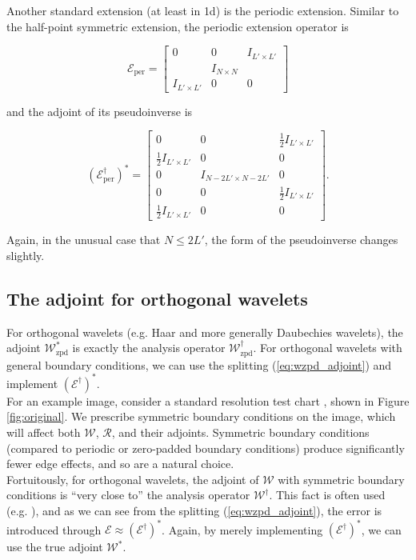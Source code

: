 \documentclass[journal]{IEEEtran}
\begin{document}
Another standard extension (at least in 1d) is the periodic extension.  Similar to the half-point symmetric extension, the periodic extension operator is

\[ \mathcal{E}_\text{per} = \begin{bmatrix} 0 & 0 & I_{L'\times L'}\\&I_{N\times N}&\\I_{L'\times L'}&0&0\end{bmatrix} \] 

\noindent and the adjoint of its pseudoinverse is

\[ \left(\mathcal{E}_\text{per}^\dagger\right)^\ast = \begin{bmatrix} 0 & 0 & \frac{1}{2}I_{L'\times L'}\\\frac{1}{2}I_{L'\times L'}&0&0\\0&I_{N-2L'\times N-2L'}&0\\0&0&\frac{1}{2}I_{L'\times L'}\\\frac{1}{2}I_{L'\times L'}&0&0\end{bmatrix}. \] 

\noindent Again, in the unusual case that $N\le 2L'$, the form of the pseudoinverse changes slightly.\\


\subsection{The adjoint for orthogonal wavelets}
For orthogonal wavelets (e.g. Haar and more generally Daubechies wavelets), the adjoint $\mathcal{W}_\text{zpd}^\ast$ is exactly the analysis operator $\mathcal{W}_\text{zpd}^\dagger$.  For orthogonal wavelets with general boundary conditions, we can use the splitting (\ref{eq:wzpd_adjoint}) and implement $\left(\mathcal{E}^\dagger\right)^\ast$.\\

For an example image, consider a standard resolution test chart \cite{weber_1993}, shown in Figure \ref{fig:original}.  We prescribe symmetric boundary conditions on the image, which will affect both $\mathcal{W}$, $\mathcal{R}$, and their adjoints.  Symmetric boundary conditions (compared to periodic or zero-padded boundary conditions) produce significantly fewer edge effects, and so are a natural choice.\\

Fortuitously, for orthogonal wavelets, the adjoint of $\mathcal{W}$ with symmetric boundary conditions is ``very close to'' the analysis operator $\mathcal{W}^\dagger$.  This fact is often used (e.g. \cite{beck_2009}), and as we can see from the splitting (\ref{eq:wzpd_adjoint}), the error is introduced through $\mathcal{E} \approx \left(\mathcal{E}^\dagger\right)^\ast$.  Again, by merely implementing $\left(\mathcal{E}^\dagger\right)^\ast$, we can use the true adjoint $\mathcal{W}^\ast$.\\
\end{document}
